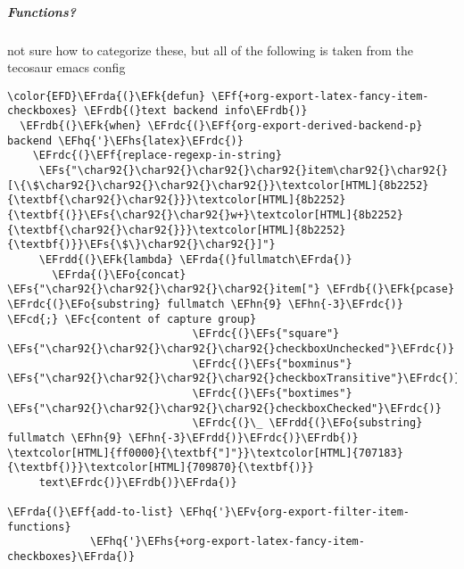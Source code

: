 \documentclass{article}
\newcommand{\EFc}[1]{\textcolor{EFc}{#1}} %
\newcommand{\EFcd}[1]{\textcolor{EFcd}{#1}} %
\newcommand{\EFs}[1]{\textcolor{EFs}{#1}} %
\newcommand{\EFk}[1]{\textcolor{EFk}{#1}} %
\newcommand{\EFf}[1]{\textcolor{EFf}{#1}} %
\newcommand{\EFv}[1]{\textcolor{EFv}{#1}} %
\newcommand{\EFo}[1]{\textcolor{EFo}{#1}} %
\newcommand{\EFhn}[1]{\textcolor{EFhn}{\textbf{#1}}} %
\newcommand{\EFhq}[1]{#1} %
\newcommand{\EFhs}[1]{\textcolor{EFhs}{#1}} %
\newcommand{\EFrda}[1]{\textcolor{EFrda}{#1}} %
\newcommand{\EFrdb}[1]{\textcolor{EFrdb}{#1}} %
\newcommand{\EFrdc}[1]{\textcolor{EFrdc}{#1}} %
\newcommand{\EFrdd}[1]{\textcolor{EFrdd}{#1}} %
\begin{document}
\subparagraph{Functions?}
\label{sec:org83ad31b}
not sure how to categorize these, but all of the following is taken from the tecosaur emacs config
\begin{Code}
\begin{Verbatim}
\color{EFD}\EFrda{(}\EFk{defun} \EFf{+org-export-latex-fancy-item-checkboxes} \EFrdb{(}text backend info\EFrdb{)}
  \EFrdb{(}\EFk{when} \EFrdc{(}\EFf{org-export-derived-backend-p} backend \EFhq{'}\EFhs{latex}\EFrdc{)}
    \EFrdc{(}\EFf{replace-regexp-in-string}
     \EFs{"\char92{}\char92{}\char92{}\char92{}item\char92{}\char92{}[\{\$\char92{}\char92{}\char92{}\char92{}}\textcolor[HTML]{8b2252}{\textbf{\char92{}\char92{}}}\textcolor[HTML]{8b2252}{\textbf{(}}\EFs{\char92{}\char92{}w+}\textcolor[HTML]{8b2252}{\textbf{\char92{}\char92{}}}\textcolor[HTML]{8b2252}{\textbf{)}}\EFs{\$\}\char92{}\char92{}]"}
     \EFrdd{(}\EFk{lambda} \EFrda{(}fullmatch\EFrda{)}
       \EFrda{(}\EFo{concat} \EFs{"\char92{}\char92{}\char92{}\char92{}item["} \EFrdb{(}\EFk{pcase} \EFrdc{(}\EFo{substring} fullmatch \EFhn{9} \EFhn{-3}\EFrdc{)} \EFcd{;} \EFc{content of capture group}
                             \EFrdc{(}\EFs{"square"}   \EFs{"\char92{}\char92{}\char92{}\char92{}checkboxUnchecked"}\EFrdc{)}
                             \EFrdc{(}\EFs{"boxminus"} \EFs{"\char92{}\char92{}\char92{}\char92{}checkboxTransitive"}\EFrdc{)}
                             \EFrdc{(}\EFs{"boxtimes"} \EFs{"\char92{}\char92{}\char92{}\char92{}checkboxChecked"}\EFrdc{)}
                             \EFrdc{(}\_ \EFrdd{(}\EFo{substring} fullmatch \EFhn{9} \EFhn{-3}\EFrdd{)}\EFrdc{)}\EFrdb{)} \textcolor[HTML]{ff0000}{\textbf{"]"}}\textcolor[HTML]{707183}{\textbf{)}}\textcolor[HTML]{709870}{\textbf{)}}
     text\EFrdc{)}\EFrdb{)}\EFrda{)}

\EFrda{(}\EFf{add-to-list} \EFhq{'}\EFv{org-export-filter-item-functions}
             \EFhq{'}\EFhs{+org-export-latex-fancy-item-checkboxes}\EFrda{)}

\end{Verbatim}
\end{Code}
\end{document}
